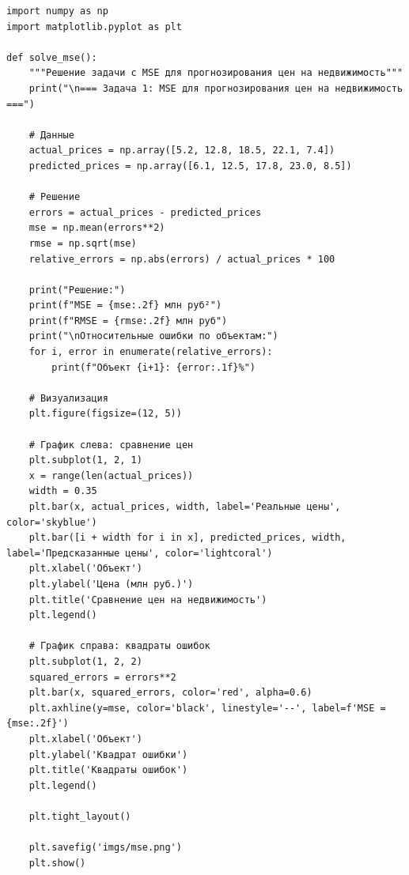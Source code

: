 \documentclass[12pt]{article}
\theoremstyle{definition}
\theoremstyle{definition}
\theoremstyle{definition}
\theoremstyle{remark}
\theoremstyle{remark}
\begin{document}
\begin{verbatim}
import numpy as np
import matplotlib.pyplot as plt

def solve_mse():
    """Решение задачи с MSE для прогнозирования цен на недвижимость"""
    print("\n=== Задача 1: MSE для прогнозирования цен на недвижимость ===")
    
    # Данные
    actual_prices = np.array([5.2, 12.8, 18.5, 22.1, 7.4])
    predicted_prices = np.array([6.1, 12.5, 17.8, 23.0, 8.5])
    
    # Решение
    errors = actual_prices - predicted_prices
    mse = np.mean(errors**2)
    rmse = np.sqrt(mse)
    relative_errors = np.abs(errors) / actual_prices * 100
    
    print("Решение:")
    print(f"MSE = {mse:.2f} млн руб²")
    print(f"RMSE = {rmse:.2f} млн руб")
    print("\nОтносительные ошибки по объектам:")
    for i, error in enumerate(relative_errors):
        print(f"Объект {i+1}: {error:.1f}%")
    
    # Визуализация
    plt.figure(figsize=(12, 5))
    
    # График слева: сравнение цен
    plt.subplot(1, 2, 1)
    x = range(len(actual_prices))
    width = 0.35
    plt.bar(x, actual_prices, width, label='Реальные цены', color='skyblue')
    plt.bar([i + width for i in x], predicted_prices, width, label='Предсказанные цены', color='lightcoral')
    plt.xlabel('Объект')
    plt.ylabel('Цена (млн руб.)')
    plt.title('Сравнение цен на недвижимость')
    plt.legend()
    
    # График справа: квадраты ошибок
    plt.subplot(1, 2, 2)
    squared_errors = errors**2
    plt.bar(x, squared_errors, color='red', alpha=0.6)
    plt.axhline(y=mse, color='black', linestyle='--', label=f'MSE = {mse:.2f}')
    plt.xlabel('Объект')
    plt.ylabel('Квадрат ошибки')
    plt.title('Квадраты ошибок')
    plt.legend()
    
    plt.tight_layout()
    
    plt.savefig('imgs/mse.png')
    plt.show()
\end{verbatim}
\end{document}
